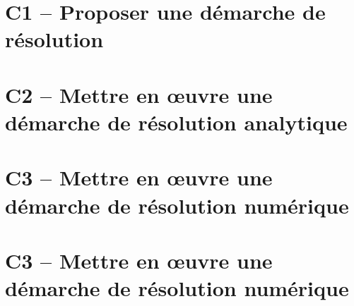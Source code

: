 
\proffalse

\section{C1 -- Proposer une démarche de résolution}
\begin{multicols}{2}


\end{multicols}

\section{C2 -- Mettre en œuvre une démarche de résolution analytique}
\begin{multicols}{2}











\end{multicols}


\section{C3 -- Mettre en œuvre une démarche de résolution numérique}
\begin{multicols}{2}
\end{multicols}
%
%
%
%
%
%
%
%
%
%
%
%
%
%
%
%
%




\section{C3 -- Mettre en œuvre une démarche de résolution numérique}

